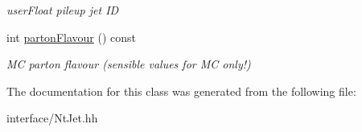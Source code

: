 \begin{DoxyCompactItemize}
\begin{DoxyCompactList}\small\item\em user\-Float pileup jet I\-D \end{DoxyCompactList}\item 
\hypertarget{classran_1_1NtJet_aabf92851c5d4855b03028f9f6c5cbdd9}{int \hyperlink{classran_1_1NtJet_aabf92851c5d4855b03028f9f6c5cbdd9}{parton\-Flavour} () const }\label{classran_1_1NtJet_aabf92851c5d4855b03028f9f6c5cbdd9}

\begin{DoxyCompactList}\small\item\em M\-C parton flavour (sensible values for M\-C only!) \end{DoxyCompactList}\end{DoxyCompactItemize}


The documentation for this class was generated from the following file\-:\begin{DoxyCompactItemize}
\item 
interface/Nt\-Jet.\-hh\end{DoxyCompactItemize}
